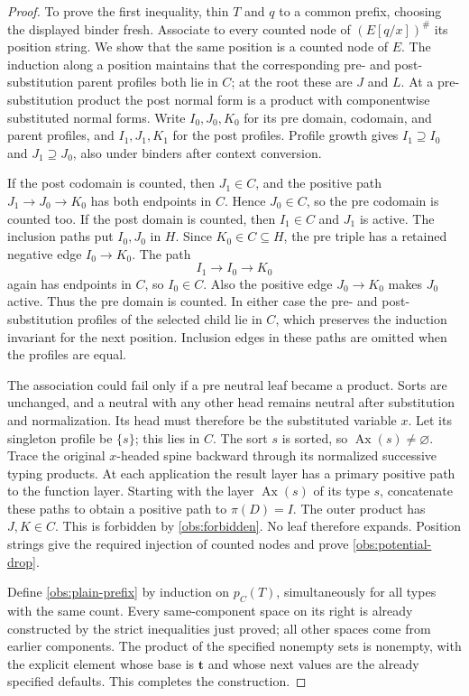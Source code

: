 \begin{proof}
To prove the first inequality, thin $T$ and $q$ to a common prefix,
choosing the displayed binder fresh.  Associate to every counted node
of $(E[q/x])^\#$ its position string.  We show that the same position
is a counted node of $E$.  The induction along a position maintains
that the corresponding pre- and post-substitution parent profiles both
lie in $C$; at the root these are $J$ and $L$.  At a pre-substitution
product the post normal form is a product with componentwise substituted
normal forms.  Write $I_0,J_0,K_0$ for its pre domain, codomain, and
parent profiles, and $I_1,J_1,K_1$ for the post profiles.  Profile growth
gives $I_1\supseteq I_0$ and $J_1\supseteq J_0$, also under binders
after context conversion.

If the post codomain is counted, then $J_1\in C$, and the positive
path $J_1\longrightarrow J_0\longrightarrow K_0$ has both endpoints
in $C$.  Hence $J_0\in C$, so the pre codomain is counted too.  If
the post domain is counted, then $I_1\in C$ and $J_1$ is active.
The inclusion paths put $I_0,J_0$ in $H$.  Since $K_0\in C\subseteq H$,
the pre triple has a retained negative edge $I_0\longrightarrow K_0$.
The path
\[
                  I_1\longrightarrow I_0\longrightarrow K_0
\]
again has endpoints in $C$, so $I_0\in C$.  Also the positive edge
$J_0\longrightarrow K_0$ makes $J_0$ active.  Thus the pre domain is
counted.  In either case the pre- and post-substitution profiles of the
selected child lie in $C$, which preserves the induction invariant for
the next position.  Inclusion edges in these paths are omitted when
the profiles are equal.

The association could fail only if a pre neutral leaf became a product.
Sorts are unchanged, and a neutral with any other head remains neutral
after substitution and normalization.  Its head must therefore be the
substituted variable $x$.  Let its singleton profile be $\{s\}$;
this lies in $C$.  The sort $s$ is sorted, so
$\operatorname{Ax}(s)\ne\varnothing$.  Trace the original $x$-headed
spine backward through its normalized successive typing products.
At each application the result layer has a primary positive path to
the function layer.  Starting with the layer
$\operatorname{Ax}(s)$ of its type $s$, concatenate these paths to
obtain a positive path to $\pi(D)=I$.  The outer product has
$J,K\in C$.  This is forbidden by \eqref{obs:forbidden}.  No leaf
therefore expands.  Position strings give the required injection of
counted nodes and prove \eqref{obs:potential-drop}.

Define \eqref{obs:plain-prefix} by induction on $p_C(T)$, simultaneously
for all types with the same count.  Every same-component space on its
right is already constructed by the strict inequalities just proved;
all other spaces come from earlier components.  The product of the
specified nonempty sets is nonempty, with the explicit element whose
base is $\mathbf t$ and whose next values are the already specified
defaults.  This completes the construction.
\end{proof}

